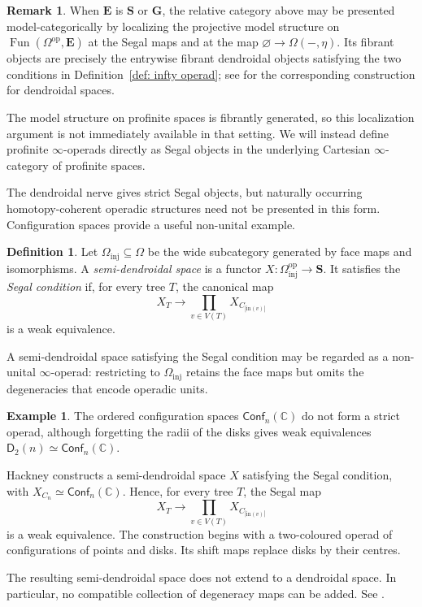 \documentclass{amsart}
\newcommand{\bE}{\mathbf{E}}
\newcommand{\sSet}{\mathbf{S}}
\newcommand{\Grpd}{\mathbf{G}}
\newcommand{\Fun}{\operatorname{Fun}}
\newcommand{\Conf}{\mathsf{Conf}}%
\theoremstyle{definition}
\newtheorem{definition}[theorem]{Definition}%
\newtheorem{example}[theorem]{Example}%
\newtheorem{remark}[theorem]{Remark}%
\numberwithin{equation}{section}
\begin{document}
\begin{remark}
When $\bE$ is $\sSet$ or $\Grpd$, the relative category above may be
presented model-categorically by localizing the projective model
structure on $\Fun(\Omega^{\mathrm{op}},\bE)$ at the Segal maps and at the map
$\varnothing\to\Omega(-,\eta)$. Its fibrant objects are precisely the
entrywise fibrant dendroidal objects satisfying the two conditions in
Definition~\ref{def: infty operad}; see
\cite{cisinski2013dendroidal} for the corresponding construction for
dendroidal spaces.

The model structure on profinite spaces is fibrantly generated, so
this localization argument is not immediately available in that
setting. We will instead define profinite $\infty$-operads directly as
Segal objects in the underlying Cartesian $\infty$-category of
profinite spaces.
\end{remark}

The dendroidal nerve gives strict Segal objects, but naturally
occurring homotopy-coherent operadic structures need not be presented
in this form. Configuration spaces provide a useful non-unital
example.

\begin{definition}
\label{def: semi-dendroidal space}
Let $\Omega_{\mathrm{inj}}\subseteq\Omega$ be the wide subcategory
generated by face maps and isomorphisms. A
\emph{semi-dendroidal space} is a functor
$X\colon\Omega_{\mathrm{inj}}^{\mathrm{op}}\to\sSet$. It satisfies the
\emph{Segal condition} if, for every tree $T$, the canonical map
\[
X_T\longrightarrow
\prod_{v\in V(T)}X_{C_{|\mathrm{in}(v)|}}
\]
is a weak equivalence.
\end{definition}

A semi-dendroidal space satisfying the Segal condition may be regarded
as a non-unital $\infty$-operad: restricting to
$\Omega_{\mathrm{inj}}$ retains the face maps but omits the
degeneracies that encode operadic units.

\begin{example}
\label{ex: infinity operad of configuration spaces}
The ordered configuration spaces $\Conf_n(\mathbb C)$ do not form a
strict operad, although forgetting the radii of the disks gives weak
equivalences
$\mathsf D_2(n)\simeq\Conf_n(\mathbb C)$.

Hackney constructs a semi-dendroidal space $X$ satisfying the Segal
condition, with
$X_{C_n}\simeq\Conf_n(\mathbb C)$. Hence, for every tree $T$, the
Segal map
\[
X_T\longrightarrow
\prod_{v\in V(T)}X_{C_{|\mathrm{in}(v)|}}
\]
is a weak equivalence. The construction begins with a two-coloured
operad of configurations of points and disks. Its shift maps replace
disks by their centres.

The resulting semi-dendroidal space does not extend to a dendroidal
space. In particular, no compatible collection of degeneracy maps
can be added. See
\cite[Corollary~5 and Proposition~6]{hackney_config}.
\end{example}
\end{document}
